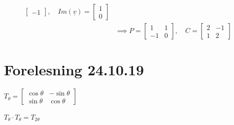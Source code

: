 \documentclass[11pt, a4paper, norsk]{article}
\begin{document}
\begin{Example}{}{}
\begin{align*}
\begin{bmatrix}
                                     -1
                                 \end{bmatrix}, \quad Im(\underline{v}) = \begin{bmatrix}
                                     1 \\
                                     0
                                 \end{bmatrix}
                                 \\
                                 &\implies P = \begin{bmatrix}
                                     1 & 1 \\
                                     -1 & 0
                                 \end{bmatrix}, \quad C = \begin{bmatrix}
                                     2 & -1 \\
                                     1 & 2
                                 \end{bmatrix}
            \end{align*}
        \end{Example}
        
        \section{Forelesning 24.10.19}
        
        $T_{\theta} = \begin{bmatrix}
            \cos{\theta} & -\sin{\theta} \\
            \sin{\theta} & \cos{\theta}
        \end{bmatrix}$ \\
        \\
        $T_{\theta} \cdot T_{\theta} = T_{2\theta}$
\end{document}

